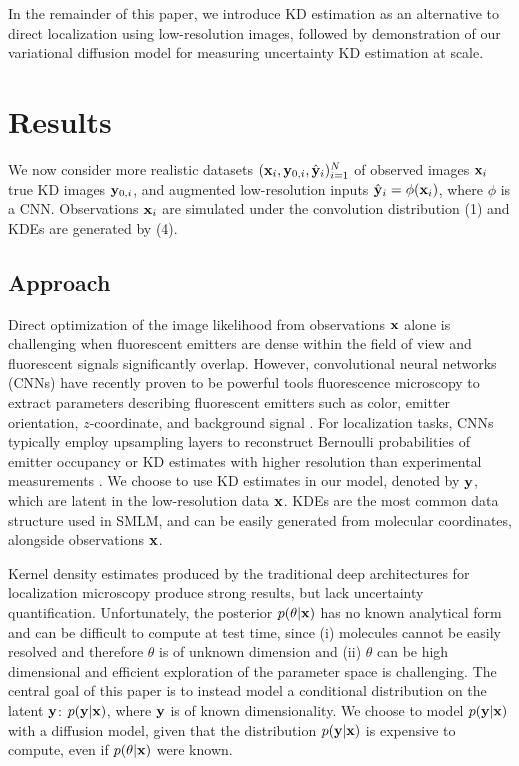 In the remainder of this paper, we introduce KD estimation as an alternative to direct localization using low-resolution images, followed by demonstration of our variational diffusion model for measuring uncertainty KD estimation at scale. 

\section{Results}

We now consider more realistic datasets $(\bold{x}_i,\bold{y}_{0,i},\hat{\bold{y}}_{i})_{i=1}^{N}$ of observed images $\bold{x}_i$ true KD images $\bold{y}_{0,i}$, and augmented low-resolution inputs $\hat{\bold{y}}_{i}=\phi(\bold{x}_{i})$, where $\phi$ is a CNN. Observations $\bold{x}_i$ are simulated under the convolution distribution (1) and KDEs are generated by (4).

\subsection{Approach}

Direct optimization of the image likelihood from observations $\bold{x}$ alone is challenging when fluorescent emitters are dense within the field of view and fluorescent signals significantly overlap. However, convolutional neural networks (CNNs) have recently proven to be powerful tools fluorescence microscopy to extract parameters describing fluorescent emitters such as color, emitter orientation, $z$-coordinate, and background signal \cite{Zhang2018,Kim2019,Zelger2018}. For localization tasks, CNNs typically employ upsampling layers to reconstruct Bernoulli probabilities of emitter occupancy \parencite{Speiser2021} or KD estimates with higher resolution than experimental measurements \parencite{Nehme2020}. We choose to use KD estimates in our model, denoted by $\bold{y}$, which are latent in the low-resolution data $\bold{x}$. KDEs are the most common data structure used in SMLM, and can be easily generated from molecular coordinates, alongside observations $\bold{x}$.

Kernel density estimates produced by the traditional deep architectures for localization microscopy produce strong results, but lack uncertainty quantification. Unfortunately, the posterior $p(\theta\lvert\bold{x})$ has no known analytical form and can be difficult to compute at test time, since (i) molecules cannot be easily resolved and therefore $\theta$ is of unknown dimension and (ii) $\theta$ can be high dimensional and efficient exploration of the parameter space is challenging. The central goal of this paper is to instead model a conditional distribution on the latent $\bold{y}$: $p(\bold{y}\lvert\bold{x})$, where $\bold{y}$ is of known dimensionality. We choose to model $p(\bold{y}\lvert\bold{x})$ with a diffusion model, given that the distribution $p(\bold{y}\lvert\bold{x})$ is expensive to compute, even if $p(\theta\lvert\bold{x})$ were known.

